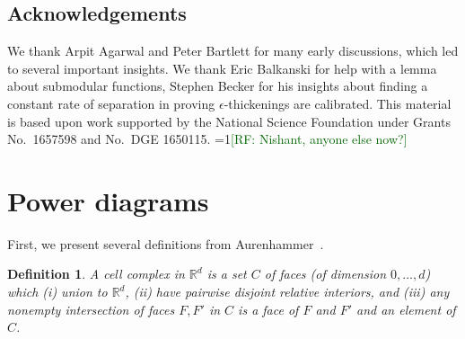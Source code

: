 \documentclass[11pt]{article}
\newcommand{\Comments}{1}
\newcommand{\mynote}[2]{\ifnum\Comments=1\textcolor{#1}{#2}\fi}
\newcommand{\raf}[1]{\mynote{darkgreen}{[RF: #1]}}
\newcommand{\jessie}[1]{\mynote{teal}{[JF: #1]}}
\newcommand{\reals}{\mathbb{R}}
\newtheorem{conjecture}{Conjecture}
\newtheorem{definition}{Definition}
\begin{document}




\subsection*{Acknowledgements}
We thank Arpit Agarwal and Peter Bartlett for many early discussions, which led to several important insights.
We thank Eric Balkanski for help with a lemma about submodular functions, Stephen Becker for his insights about finding a constant rate of separation in proving $\epsilon$-thickenings are calibrated.
This material is based upon work supported by the National Science Foundation under Grants No.\ 1657598 and No.\ DGE 1650115.
\raf{Nishant, anyone else now?}
\newpage



\appendix

\newpage
\section{Power diagrams}\label{app:power-diagrams}
First, we present several definitions from Aurenhammer~\cite{aurenhammer1987power}.
\begin{definition}\label{def:cell-complex}
  A \emph{cell complex} in $\reals^d$ is a set $C$ of faces (of dimension $0,\ldots,d$) which (i) union to $\reals^d$, (ii) have pairwise disjoint relative interiors, and (iii) any nonempty intersection of faces $F,F'$ in $C$ is a face of $F$ and $F'$ and an element of $C$.
\end{definition}
\end{document}
